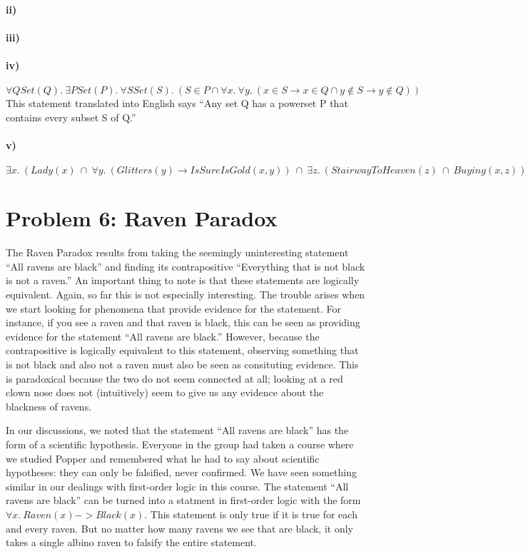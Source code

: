 \documentclass[10pt,letter]{article}
\begin{document}
\paragraph{ii)}

\paragraph{iii)}

\paragraph{iv)}
$\forall Q Set(Q) .\ \exists P Set(P) .\ \forall S Set(S) .\ (S \in P \cap \forall x .\ \forall y .\ (x \in S \rightarrow x \in Q \cap y \not \in S \rightarrow y \not \in Q))$
This statement translated into English says ``Any set Q has a powerset P that contains every subset S of Q.''
\paragraph{v)}
$\exists x .\ (Lady(x)\ \cap\ \forall y .\ (Glitters(y) \rightarrow IsSureIsGold(x, y))\ \cap\ \exists z .\ (StairwayToHeaven(z)\ \cap\ Buying(x, z)))$

\section*{Problem 6: Raven Paradox}
The Raven Paradox results from taking the seemingly uninteresting statement ``All ravens are black'' and finding its contrapositive ``Everything that is not black is not a raven.'' An important thing to note is that these statements are logically equivalent. Again, so far this is not especially interesting. The trouble arises when we start looking for phenomena that provide evidence for the statement. For instance, if you see a raven and that raven is black, this can be seen as providing evidence for the statement ``All ravens are black.'' However, because the contrapositive is logically equivalent to this statement, observing something that is not black and also not a raven must also be seen as consituting evidence. This is paradoxical because the two do not seem connected at all; looking at a red clown nose does not (intuitively) seem to give us any evidence about the blackness of ravens. 

In our discussions, we noted that the statement ``All ravens are black'' has the form of a scientific hypothesis. Everyone in the group had taken a course where we studied Popper and remembered what he had to say about scientific hypotheses: they can only be falsified, never confirmed. We have seen something similar in our dealings with first-order logic in this course. The statement ``All ravens are black'' can be turned into a statment in first-order logic with the form $\forall x .\ Raven(x) -> Black(x)$. This statement is only true if it is true for each and every raven. But no matter how many ravens we see that are black, it only takes a single albino raven to falsify the entire statement. 
\end{document}

